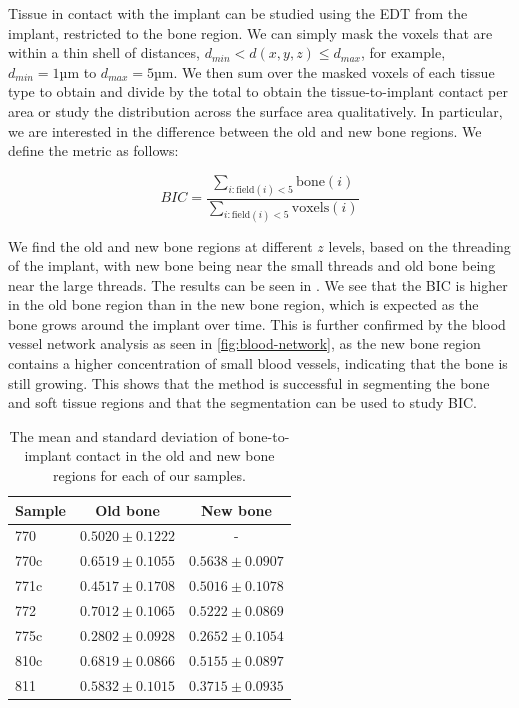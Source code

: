 Tissue in contact with the implant can be studied using the EDT from the
implant, restricted to the bone region. We can simply mask the voxels that are
within a thin shell of distances, $d_{min} < d(x,y,z) \le d_{max}$, for
example, $d_{min} = 1 \text{µm}$ to $d_{max} = 5 \text{µm}$. We then sum over
the masked voxels of each tissue type to obtain and divide by the total to
obtain the tissue-to-implant contact per area or study the distribution across
the surface area qualitatively. In particular, we are interested in the
difference between the old and new bone regions. We define the metric as
follows:

\begin{equation}
    BIC = \frac{\sum_{i : \text{field}(i) < 5} \text{bone}(i)}{\sum_{i : \text{field}(i) < 5} \text{voxels}(i)}
\end{equation}

We find the old and new bone regions at different $z$ levels, based on the
threading of the implant, with new bone being near the small threads and old
bone being near the large threads. The results can be seen in .
We see that the BIC is higher in the old bone region than in the new bone
region, which is expected as the bone grows around the implant over time. This
is further confirmed by the blood vessel network analysis as seen in
\cref{fig:blood-network}, as the new bone region contains a higher
concentration of small blood vessels, indicating that the bone is still
growing. This shows that the method is successful in segmenting the bone and
soft tissue regions and that the segmentation can be used to study BIC.

\begin{table}
    \caption{The mean and standard deviation of bone-to-implant contact in the
    old and new bone regions for each of our samples.}
    \label{tab:bic}
    \centering
    \begin{tabular}{lcc}
        \toprule
        Sample & Old bone & New bone \\
        \midrule
        770 & $0.5020 \pm 0.1222$ & - \\
        770c & $0.6519 \pm 0.1055$ & $0.5638 \pm 0.0907$ \\
        771c & $0.4517 \pm 0.1708$ & $0.5016 \pm 0.1078$ \\
        772 & $0.7012 \pm 0.1065$ & $0.5222 \pm 0.0869$ \\
        775c & $0.2802 \pm 0.0928$ & $0.2652 \pm 0.1054$ \\
        810c & $0.6819 \pm 0.0866$ & $0.5155 \pm 0.0897$ \\
        811 & $0.5832 \pm 0.1015$ & $0.3715 \pm 0.0935$ \\
        \bottomrule
    \end{tabular}
\end{table}

